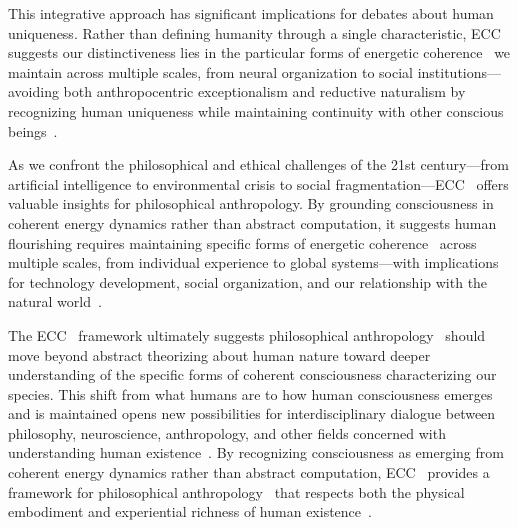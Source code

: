 This integrative approach has significant implications for debates about human uniqueness. Rather than defining humanity through a single characteristic, ECC~ suggests our distinctiveness lies in the particular forms of energetic coherence~ we maintain across multiple scales, from neural organization to social institutions—avoiding both anthropocentric exceptionalism and reductive naturalism by recognizing human uniqueness while maintaining continuity with other conscious beings~\cite{Brown1991, Cassirer1944}.

As we confront the philosophical and ethical challenges of the 21st century—from artificial intelligence to environmental crisis to social fragmentation—ECC~ offers valuable insights for philosophical anthropology. By grounding consciousness in coherent energy dynamics rather than abstract computation, it suggests human flourishing requires maintaining specific forms of energetic coherence~ across multiple scales, from individual experience to global systems—with implications for technology development, social organization, and our relationship with the natural world~\cite{McGilchrist2019, Taylor1991}.

The ECC~ framework ultimately suggests philosophical anthropology~ should move beyond abstract theorizing about human nature toward deeper understanding of the specific forms of coherent consciousness characterizing our species. This shift from what humans are to how human consciousness emerges and is maintained opens new possibilities for interdisciplinary dialogue between philosophy, neuroscience, anthropology, and other fields concerned with understanding human existence~\cite{Heidegger1962, Husserl1991}. By recognizing consciousness as emerging from coherent energy dynamics rather than abstract computation, ECC~ provides a framework for philosophical anthropology~ that respects both the physical embodiment and experiential richness of human existence~\cite{Bruner1990, Sartre1956}.

